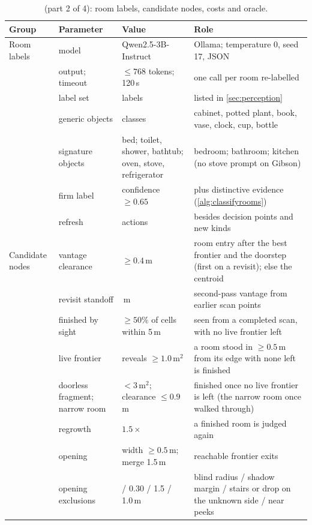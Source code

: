 \documentclass[10pt]{article}
\begin{document}
\begin{table}[p]
\centering
\small
\caption*{ (part 2 of 4): room labels, candidate nodes, costs and oracle.}
\begin{tabular}{@{}>{\raggedright\arraybackslash}p{1.9cm}>{\raggedright\arraybackslash}p{3.1cm}>{\raggedright\arraybackslash}p{3.8cm}>{\raggedright\arraybackslash}p{5.6cm}@{}}
\toprule
Group & Parameter & Value & Role \\
\midrule
Room labels & model & Qwen2.5-3B-Instruct & Ollama; temperature 0, seed 17, JSON~\citep{yang2024qwen25} \\
 & output; timeout & $\le 768$ tokens; 120\,s & one call per room re-labelled \\
 & label set & 15 labels & listed in \cref{sec:perception} \\
 & generic objects & 7 classes & cabinet, potted plant, book, vase, clock, cup, bottle \\
 & signature objects & bed; toilet, shower, bathtub; oven, stove, refrigerator & bedroom; bathroom; kitchen (no stove prompt on Gibson) \\
 & firm label & confidence $\ge 0.65$ & plus distinctive evidence (\cref{alg:classifyrooms}) \\
 & refresh & 50 actions & besides decision points and new kinds \\
\midrule
Candidate nodes & vantage clearance & $\ge 0.4$\,m & room entry after the best frontier and the doorstep (first on a revisit); else the centroid \\
 & revisit standoff & 1.5\,m & second-pass vantage from earlier scan points \\
 & finished by sight & $\ge 50\%$ of cells within 5\,m & seen from a completed scan, with no live frontier left \\
 & live frontier & reveals $\ge 1.0$\,m$^2$ & a room stood in $\ge 0.5$\,m from its edge with none left is finished \\
 & doorless fragment; narrow room & $< 3$\,m$^2$; clearance $\le 0.9$\,m & finished once no live frontier is left (the narrow room once walked through) \\
 & regrowth & $1.5\times$ & a finished room is judged again \\
 & opening & width $\ge 0.5$\,m; merge 1.5\,m & reachable frontier exits \\
 & opening exclusions & 1.2 / 0.30 / 1.5 / 1.0\,m & blind radius / shadow margin / stairs or drop on the unknown side / near peeks \\

\end{tabular}
\end{table}
\end{document}
